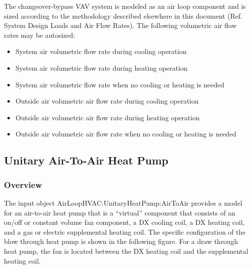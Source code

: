 The changeover-bypass VAV system is modeled as an air loop component and is sized according to the methodology described elsewhere in this document (Ref. System Design Loads and Air Flow Rates). The following volumetric air flow rates may be autosized:

\begin{itemize}
\item System air volumetric flow rate during cooling operation
\item System air volumetric flow rate during heating operation
\item System air volumetric flow rate when no cooling or heating is needed
\item Outside air volumetric air flow rate during cooling operation
\item Outside air volumetric air flow rate during heating operation
\item Outside air volumetric air flow rate when no cooling or heating is needed
\end{itemize}

\subsection{Unitary Air-To-Air Heat Pump}\label{unitary-air-to-air-heat-pump}

\subsubsection{Overview}\label{overview-3}

The input object AirLoopHVAC:UnitaryHeatPump:AirToAir provides a model for an air-to-air heat pump that is a ``virtual'' component that consists of an on/off or constant volume fan component, a DX cooling coil, a DX heating coil, and a gas or electric supplemental heating coil. The specific configuration of the blow through heat pump is shown in the following figure. For a draw through heat pump, the fan is located between the DX heating coil and the supplemental heating coil.

